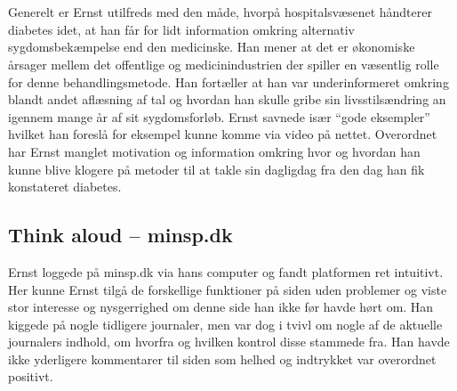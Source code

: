 \documentclass[english]{article}
\begin{document}
\\ \\
Generelt er Ernst utilfreds med den måde, hvorpå hospitalsvæsenet håndterer diabetes idet, at han får for lidt information omkring alternativ sygdomsbekæmpelse end den medicinske. Han mener at det er økonomiske årsager mellem det offentlige og medicinindustrien der spiller en væsentlig rolle for denne behandlingsmetode. Han fortæller at han var underinformeret omkring blandt andet aflæsning af tal og hvordan han skulle gribe sin livsstilsændring an igennem mange år af sit sygdomsforløb. Ernst savnede især “gode eksempler” hvilket han foreslå for eksempel kunne komme via video på nettet. Overordnet har Ernst manglet motivation og information omkring hvor og hvordan han kunne blive klogere på metoder til at takle sin dagligdag fra den dag han fik konstateret diabetes.

\subsection*{Think aloud – minsp.dk} 
Ernst loggede på minsp.dk via hans computer og fandt platformen ret intuitivt. Her kunne Ernst tilgå de forskellige funktioner på siden uden problemer og viste stor interesse og nysgerrighed om denne side han ikke før havde hørt om. Han kiggede på nogle tidligere journaler, men var dog i tvivl om nogle af de aktuelle journalers indhold, om hvorfra og hvilken kontrol disse stammede fra. Han havde ikke yderligere kommentarer til siden som helhed og indtrykket var overordnet positivt.
\end{document}

